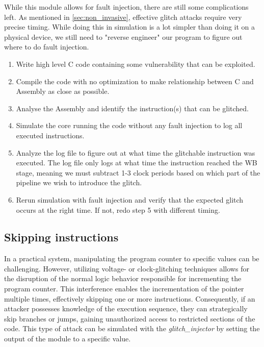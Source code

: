 While this module allows for fault injection, there are still some complications left. As mentioned in \autoref{sec:non_invasive}, effective glitch attacks require very precise timing. While doing this in simulation is a lot simpler than doing it on a physical device, we still need to "reverse engineer" our program to figure out where to do fault injection. 

\begin{enumerate}
    \item Write high level C code containing some vulnerability that can be exploited. 
    \item Compile the code with no optimization to make relationship between C and Assembly as close as possible.
    \item Analyse the Assembly and identify the instruction(s) that can be glitched.
    \item Simulate the core running the code without any fault injection to log all executed instructions. 
    \item Analyze the log file to figure out at what time the glitchable instruction was executed. The log file only logs at what time the instruction reached the WB stage, meaning we must subtract 1-3 clock periods based on which part of the pipeline we wish to introduce the glitch. 
    \item Rerun simulation with fault injection and verify that the expected glitch occurs at the right time. If not, redo step 5 with different timing. 
\end{enumerate}

\subsection{Skipping instructions}
\label{subsec:skip_instr}

In a practical system, manipulating the program counter to specific values can be challenging. However, utilizing voltage- or clock-glitching techniques allows for the disruption of the normal logic behavior responsible for incrementing the program counter. This interference enables the incrementation of the pointer multiple times, effectively skipping one or more instructions. Consequently, if an attacker possesses knowledge of the execution sequence, they can strategically skip branches or jumps, gaining unauthorized access to restricted sections of the code. This type of attack can be simulated with the \textit{glitch\_injector} by setting the output of the module to a specific value. 

